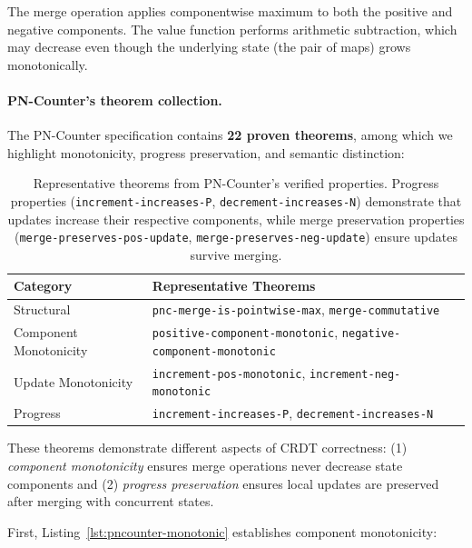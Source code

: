 The merge operation applies componentwise maximum to both the positive and negative components. The value function performs arithmetic subtraction, which may decrease even though the underlying state (the pair of maps) grows monotonically.

\paragraph{PN-Counter's theorem collection.}

The PN-Counter specification contains \textbf{22 proven theorems}, among which we highlight monotonicity, progress preservation, and semantic distinction:

\begin{table}[h]
  \centering
  \small
  \begin{tabular}{lp{5cm}}
    \toprule
    \textbf{Category} & \textbf{Representative Theorems}\\
    \midrule
    Structural & \texttt{pnc-merge-is-pointwise-max}, \texttt{merge-commutative}\\
    \midrule
    Component Monotonicity & \texttt{positive-component-monotonic}, \texttt{negative-component-monotonic}\\
    \midrule
    Update Monotonicity & \texttt{increment-pos-monotonic}, \texttt{increment-neg-monotonic}\\
    \midrule
    Progress & \texttt{increment-increases-P}, \texttt{decrement-increases-N}\\
    \bottomrule
  \end{tabular}
  \caption{Representative theorems from PN-Counter's verified properties. Progress properties (\texttt{increment-increases-P}, \texttt{decrement-increases-N}) demonstrate that updates increase their respective components, while merge preservation properties (\texttt{merge-preserves-pos-update}, \texttt{merge-preserves-neg-update}) ensure updates survive merging.}
  \label{tab:pncounter-theorems}
\end{table}

These theorems demonstrate different aspects of CRDT correctness: (1) \emph{component monotonicity} ensures merge operations never decrease state components and (2) \emph{progress preservation} ensures local updates are preserved after merging with concurrent states.

First, Listing~\ref{lst:pncounter-monotonic} establishes component monotonicity:

